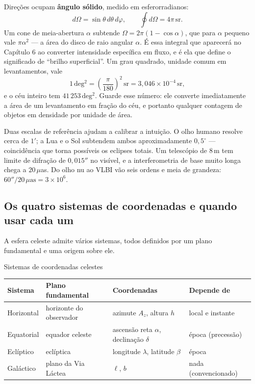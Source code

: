 \documentclass[11pt,a4paper]{article}
\begin{document}
Direções ocupam \textbf{ângulo sólido}, medido em esferorradianos:
\[
d\Omega=\sin\theta\,d\theta\,d\varphi,
\qquad
\oint d\Omega=4\pi\,\mathrm{sr}.
\]
Um cone de meia-abertura $\alpha$ subtende $\Omega=2\pi(1-\cos\alpha)$, que para $\alpha$ pequeno vale $\pi\alpha^{2}$ --- a área do disco de raio angular $\alpha$. É essa integral que aparecerá no Capítulo 6 ao converter intensidade específica em fluxo, e é ela que define o significado de ``brilho superficial''. Um grau quadrado, unidade comum em levantamentos, vale
\[
1\,\mathrm{deg^{2}}=\left(\frac{\pi}{180}\right)^{2}\,\mathrm{sr}=3{,}046\times10^{-4}\,\mathrm{sr},
\]
e o céu inteiro tem $41\,253\,\mathrm{deg^{2}}$. Guarde esse número: ele converte imediatamente a área de um levantamento em fração do céu, e portanto qualquer contagem de objetos em densidade por unidade de área.

Duas escalas de referência ajudam a calibrar a intuição. O olho humano resolve cerca de $1'$; a Lua e o Sol subtendem ambos aproximadamente $0{,}5^\circ$ --- coincidência que torna possíveis os eclipses totais. Um telescópio de $8\,\mathrm{m}$ tem limite de difração de $0{,}015''$ no visível, e a interferometria de base muito longa chega a $20\,\mu$as. Do olho nu ao VLBI vão seis ordens e meia de grandeza: $60''/20\,\mu\mathrm{as}=3\times10^{6}$.

\subsection*{Os quatro sistemas de coordenadas e quando usar cada um}

A esfera celeste admite vários sistemas, todos definidos por um plano fundamental e uma origem sobre ele.

\begin{lessonblock}{Sistemas de coordenadas celestes}
\begin{tabular}{>{\raggedright\arraybackslash}p{}>{\raggedright\arraybackslash}p{}>{\raggedright\arraybackslash}p{}>{\raggedright\arraybackslash}p{}}
\toprule
Sistema & Plano fundamental & Coordenadas & Depende de \\
\midrule
Horizontal & horizonte do observador & azimute $A_z$, altura $h$ & local e instante \\
Equatorial & equador celeste & ascensão reta $\alpha$, declinação $\delta$ & época (precessão) \\
Eclíptico & eclíptica & longitude $\lambda$, latitude $\beta$ & época \\
Galáctico & plano da Via Láctea & $\ell$, $b$ & nada (convencionado) \\
\bottomrule
\end{tabular}
\end{lessonblock}
\end{document}

